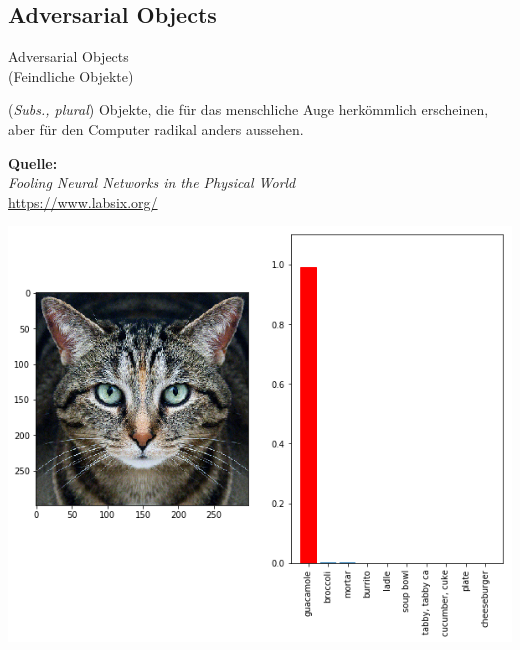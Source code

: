 \documentclass[aspectratio=43,x11names]{beamer}
\begin{document}

\subsection{Adversarial Objects}
\begin{frame}
\begin{center}
\huge
\glqq Adversarial Objects\grqq \\
\Large
(Feindliche Objekte)
\end{center}
\bigskip
\normalsize

(\textit{Subs., plural}) Objekte, die für das menschliche Auge herkömmlich erscheinen, aber für den Computer radikal anders aussehen.
\bigskip

\begin{center}
\textbf{Quelle:}\\
\emph{Fooling Neural Networks in the Physical World}\\
\url{https://www.labsix.org/}
\end{center}
\end{frame}

\begin{frame}
\begin{center}
\includegraphics[width=\textwidth]{images/cat_adversarial.png} 
\end{center}
\end{frame}
\end{document}
